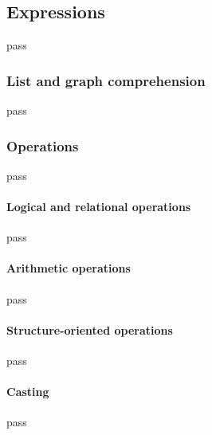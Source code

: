 \subsection{Expressions}
\label{sec:expressions}
pass

\subsubsection{List and graph comprehension}
\label{sec:comprehension}
pass

\subsubsection{Operations}
\label{sec:operations}
pass

\paragraph{Logical and relational operations}
pass

\paragraph{Arithmetic operations}
pass

\paragraph{Structure-oriented operations}
pass

\paragraph{Casting}
\label{sec:casting}
pass